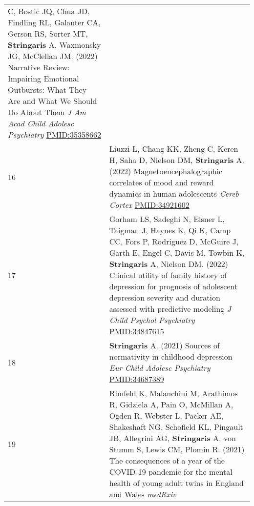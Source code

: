 \documentclass[
]{article}
\begin{document}
\begin{longtable}[]{@{}ll@{}}
\begin{minipage}[t]{0.94\columnwidth}
C, Bostic JQ, Chua JD, Findling RL, Galanter CA, Gerson RS, Sorter MT,
\textbf{Stringaris} A, Waxmonsky JG, McClellan JM. (2022) Narrative
Review: Impairing Emotional Outbursts: What They Are and What We Should
Do About Them \emph{J Am Acad Child Adolesc Psychiatry}
\url{PMID:35358662}\strut
\end{minipage}\tabularnewline
\begin{minipage}[t]{0.01\columnwidth}\raggedright
16\strut
\end{minipage} & \begin{minipage}[t]{0.94\columnwidth}\raggedright
Liuzzi L, Chang KK, Zheng C, Keren H, Saha D, Nielson DM,
\textbf{Stringaris} A. (2022) Magnetoencephalographic correlates of mood
and reward dynamics in human adolescents \emph{Cereb Cortex}
\url{PMID:34921602}\strut
\end{minipage}\tabularnewline
\begin{minipage}[t]{0.01\columnwidth}\raggedright
17\strut
\end{minipage} & \begin{minipage}[t]{0.94\columnwidth}\raggedright
Gorham LS, Sadeghi N, Eisner L, Taigman J, Haynes K, Qi K, Camp CC, Fors
P, Rodriguez D, McGuire J, Garth E, Engel C, Davis M, Towbin K,
\textbf{Stringaris} A, Nielson DM. (2022) Clinical utility of family
history of depression for prognosis of adolescent depression severity
and duration assessed with predictive modeling \emph{J Child Psychol
Psychiatry} \url{PMID:34847615}\strut
\end{minipage}\tabularnewline
\begin{minipage}[t]{0.01\columnwidth}\raggedright
18\strut
\end{minipage} & \begin{minipage}[t]{0.94\columnwidth}\raggedright
\textbf{Stringaris} A. (2021) Sources of normativity in childhood
depression \emph{Eur Child Adolesc Psychiatry} \url{PMID:34687389}\strut
\end{minipage}\tabularnewline
\begin{minipage}[t]{0.01\columnwidth}\raggedright
19\strut
\end{minipage} & \begin{minipage}[t]{0.94\columnwidth}\raggedright
Rimfeld K, Malanchini M, Arathimos R, Gidziela A, Pain O, McMillan A,
Ogden R, Webster L, Packer AE, Shakeshaft NG, Schofield KL, Pingault JB,
Allegrini AG, \textbf{Stringaris} A, von Stumm S, Lewis CM, Plomin R.
(2021) The consequences of a year of the COVID-19 pandemic for the
mental health of young adult twins in England and Wales \emph{medRxiv}

\end{minipage}
\end{longtable}
\end{document}
